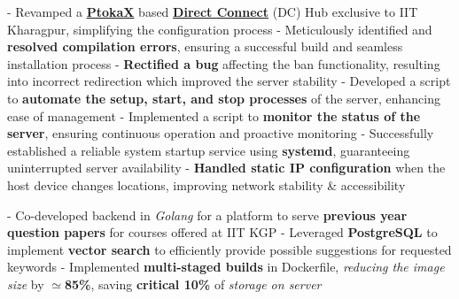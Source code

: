 \documentclass[a4paper,10pt]{extarticle} %
\begin{document}
\begin{description}[style=nextline, font=$\bullet$\hspace{2mm}\normalsize]
\item[{\href{https://github.com/proffapt/Metahub}{Metahub}} | C, Networking, Bash, systemd ]
- Revamped a \href{http://www.ptokax.org/}{\textbf{PtokaX}} based \href{https://en.wikipedia.org/wiki/Direct_Connect_(protocol)}{\textbf{Direct Connect}} (DC) Hub exclusive to IIT Kharagpur, simplifying the configuration process \newline
- Meticulously identified and \textbf{resolved compilation errors}, ensuring a successful build and seamless installation process \newline
- \textbf{Rectified a bug} affecting the ban functionality, resulting into incorrect redirection which improved the server stability \newline
- Developed a script to \textbf{automate the setup, start, and stop processes} of the server, enhancing ease of management \newline
- Implemented a script to \textbf{monitor the status of the server}, ensuring continuous operation and proactive monitoring \newline
- Successfully established a reliable system startup service using \textbf{systemd}, guaranteeing uninterrupted server availability \newline
- \textbf{Handled static IP configuration} when the host device changes locations, improving network stability \& accessibility


\item[{\href{https://qp.metakgp.org}{Intelligent Question Paper Search}} | Golang, Docker, PostgreSQL, GitHub Actions]
- Co-developed backend in \textit{Golang} for a platform to serve \textbf{previous year question papers} for courses offered at IIT KGP \newline
- Leveraged \textbf{PostgreSQL} to implement \textbf{vector search} to efficiently provide possible suggestions for requested keywords \newline
- Implemented \textbf{multi-staged builds} in Dockerfile, \textit{reducing the image size} by \textbf{$\simeq$85\%}, saving \textbf{critical 10\%} of \textit{storage on server}


\end{description}
\end{document}
